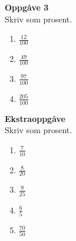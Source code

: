 \eks[1]{ \vspace{-11pt}
\[ \frac{15}{100}=15\% \]
}
\eks[2]{ \vspace{-11pt}
	\[ \frac{83}{100}=83\% \]
}
\vspace{20pt}
{\Large \textbf{Oppgåve 3}}\\[10pt]
Skriv som prosent.
\begin{enumerate}[label=\alph*)]
	\item $\displaystyle \frac{12}{100} $\\[10pt]
		\item $\displaystyle \frac{49}{100} $\\[10pt]
		\item $\displaystyle \frac{97}{100} $\\[10pt]
	\item $\displaystyle \frac{205}{100} $\\[10pt]
\end{enumerate}
\vspace{20pt}
{\Large \textbf{Ekstraoppgåve}}\\[10pt]
Skriv som prosent.
\begin{enumerate}[label=\alph*)]
	\item $\displaystyle \frac{7}{10} $\\[10pt]
	\item $\displaystyle \frac{8}{20} $\\[10pt]
	\item $\displaystyle \frac{9}{25} $\\[10pt]
	\item $\displaystyle \frac{6}{5} $\\[10pt]
	\item $\displaystyle \frac{70}{50} $\\[10pt]
\end{enumerate}



